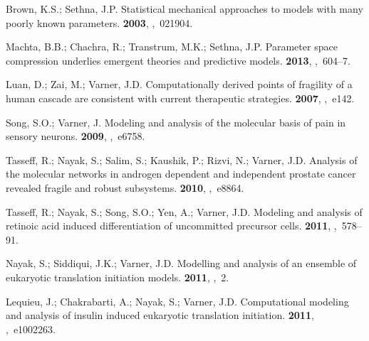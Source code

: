 \documentclass[processes,article,accept,moreauthors,pdftex,12pt,a4paper]{mdpi}
\begin{document}
\begin{thebibliography}{----}
Brown, K.S.; Sethna, J.P.
\newblock Statistical mechanical approaches to models with many poorly known
  parameters.
 {\bf 2003},
,~021904.

Machta, B.B.; Chachra, R.; Transtrum, M.K.; Sethna, J.P.
\newblock Parameter space compression underlies emergent theories and
  predictive models.
 {\bf 2013},
,~604--7.

Luan, D.; Zai, M.; Varner, J.D.
\newblock Computationally derived points of fragility of a human cascade are
  consistent with current therapeutic strategies.
 {\bf 2007},
,~e142.

Song, S.O.; Varner, J.
\newblock Modeling and analysis of the molecular basis of pain in sensory
  neurons.
 {\bf 2009},
,~e6758.

Tasseff, R.; Nayak, S.; Salim, S.; Kaushik, P.; Rizvi, N.; Varner, J.D.
\newblock Analysis of the molecular networks in androgen dependent and
  independent prostate cancer revealed fragile and robust subsystems.
 {\bf 2010},
,~e8864.

Tasseff, R.; Nayak, S.; Song, S.O.; Yen, A.; Varner, J.D.
\newblock Modeling and analysis of retinoic acid induced differentiation of
  uncommitted precursor cells.
 {\bf 2011},
,~578--91.

Nayak, S.; Siddiqui, J.K.; Varner, J.D.
\newblock Modelling and analysis of an ensemble of eukaryotic translation
  initiation models.
 {\bf 2011},
,~2.

Lequieu, J.; Chakrabarti, A.; Nayak, S.; Varner, J.D.
\newblock Computational modeling and analysis of insulin induced eukaryotic
  translation initiation.
 {\bf 2011},
,~e1002263.


\end{thebibliography}
\end{document}
